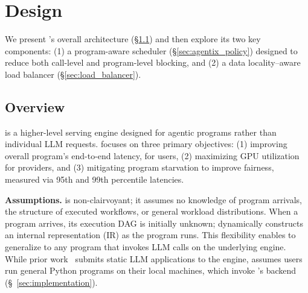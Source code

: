 \section{\text{\name} Design}
\label{sec:solution}

We present \text{\name}'s overall architecture (\S\ref{sec:agentix_overview}) and then explore its two key components: (1) a program-aware scheduler (\S\ref{sec:agentix_policy}) designed to reduce both call-level and program-level blocking, and (2) a data locality–aware load balancer (\S\ref{sec:load_balancer}).

\subsection{Overview} \label{sec:agentix_overview}

\text{\name} is a higher-level serving engine designed for agentic programs rather than individual LLM requests.
\text{\name} focuses on three primary objectives: (1) improving overall program's end-to-end latency, for users, (2) maximizing GPU utilization for providers, and (3) mitigating program starvation to improve fairness, measured via 95th and 99th percentile latencies.


\vspace{1mm} \noindent\textbf{Assumptions.} \text{\name} is non-clairvoyant; it assumes
no knowledge of program arrivals, the structure of executed workflows, or general workload distributions. When a program arrives, its execution DAG is initially unknown; \text{\name} dynamically constructs an internal representation (IR) as the program runs. This flexibility enables \text{\name} to generalize to any program that invokes LLM calls on the underlying engine. While prior work~\cite{lin2024parrotefficientservingllmbased}
submits static LLM applications to the engine, \text{\name} assumes users run general Python programs on their local machines, which invoke \text{\name}'s backend (\S~\ref{sec:implementation}).

